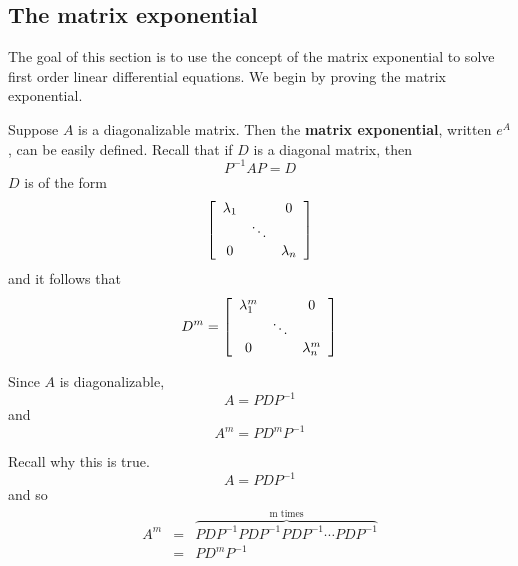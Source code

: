 
\subsection{The matrix exponential}

The goal of this section is to use the concept of the matrix exponential to solve first order linear differential equations. We begin by proving the matrix exponential. 

Suppose $A$ is a diagonalizable matrix. Then the {\bf matrix exponential}, written $e^{A}$, can be easily defined. 
Recall that if $D$ is a diagonal matrix, then  
\begin{equation*}
P^{-1}AP=D
\end{equation*}
$D$ is of the form 
\begin{equation}
\left[ 
\begin{array}{ccc}
\lambda _{1} &  & 0 \\ 
& \ddots &  \\ 
0 &  & \lambda _{n}
\end{array}
\right]  \label{diagonalmatrix}
\end{equation}
and it follows that 
\begin{equation*}
D^{m}=\left[ 
\begin{array}{ccc}
\lambda _{1}^{m} &  & 0 \\ 
& \ddots &  \\ 
0 &  & \lambda _{n}^{m}
\end{array}
\right]
\end{equation*}

Since $A$ is diagonalizable, 
\begin{equation*}
A=PDP^{-1}
\end{equation*}
and
\begin{equation*}
A^{m}=PD^{m}P^{-1}
\end{equation*}

Recall why this is true. 
\begin{equation*}
A=PDP^{-1}
\end{equation*}
and so 
\begin{eqnarray*}
A^{m} &=&\overset{
\text{m times}}{\overbrace{PDP^{-1}PDP^{-1}PDP^{-1}\cdots PDP^{-1}}} \\
&=&PD^{m}P^{-1}
\end{eqnarray*}

